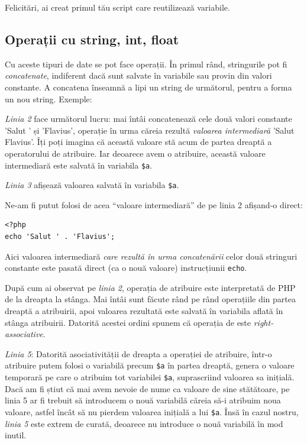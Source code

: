 Felicitări, ai creat primul tău script care reutilizează variabile.

\subsection{Operații cu string, int, float}
Cu aceste tipuri de date se pot face operații. În primul rând,
stringurile pot fi \textsl{concatenate}, indiferent dacă sunt salvate
în variabile sau provin din valori constante. A concatena
înseamnă a lipi un string de următorul, pentru a forma un nou string.
Exemple:


\textit{Linia 2} face următorul lucru: mai întâi concatenează cele două valori constante
'Salut ' și 'Flavius', operație în urma căreia rezultă \textsl{valoarea intermediară}
'Salut Flavius'. Îți poți imagina că această valoare stă acum de partea
dreaptă a operatorului de atribuire. Iar deoarece avem o atribuire, această
valoare intermediară este salvată în variabila \texttt{\$a}.

\textit{Linia 3} afișează valoarea salvată în variabila \texttt{\$a}.

Ne-am fi putut folosi de acea ``valoare intermediară'' de pe linia 2 afișand-o direct:
\begin{lstlisting}
<?php
echo 'Salut ' . 'Flavius';
\end{lstlisting}
Aici valoarea intermediară \textit{care rezultă în urma concatenării} celor două stringuri
constante este pasată direct (ca o nouă valoare) instrucțiunii \texttt{echo}.

După cum ai observat pe \textit{linia 2}, operația de atribuire este interpretată
de PHP de la dreapta la stânga. Mai întâi sunt făcute rând pe rând operațiile
din partea dreaptă a atribuirii, apoi valoarea rezultată este salvată în
variabila aflată în stânga atribuirii. Datorită acestei ordini spunem că
operația de  este \textsl{right-associative}.

\textit{Linia 5}: Datorită asociativității de dreapta a operației de atribuire,
într-o atribuire putem folosi o variabilă precum \texttt{\$a} în partea dreaptă, genera
o valoare temporară pe care o atribuim tot variabilei \texttt{\$a}, suprascriind
valoarea sa inițială. Dacă am fi știut că mai avem nevoie de nume ca valoare
de sine stătătoare, pe linia 5 ar fi trebuit să introducem o nouă variabilă
căreia să-i atribuim noua valoare,
astfel încât să nu pierdem valoarea inițială a lui \texttt{\$a}.
Însă în cazul nostru, \textit{linia 5} este extrem de curată,
deoarece nu introduce o nouă variabilă în mod inutil.

